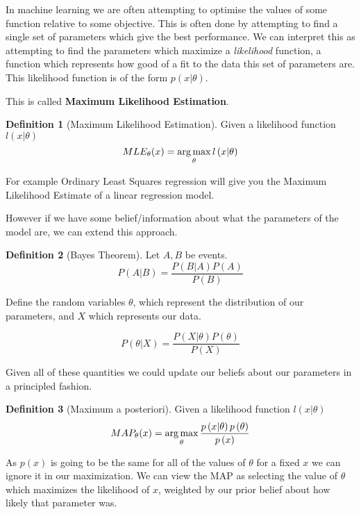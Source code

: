 \documentclass[12pt, a4paper]{report}
\theoremstyle{definition}
\theoremstyle{definition}
\newtheorem{definition}{Definition}[section]
\theoremstyle{definition}
\begin{document}
In machine learning we are often attempting to optimise the values of some function relative to some objective. This is often done by attempting to find a single set of parameters which give the best performance. We can interpret this as attempting to find the parameters which maximize a \textit{likelihood} function, a function which represents how good of a fit to the data this set of parameters are. This likelihood function is of the form $p(x | \theta)$.


This is called \textbf{Maximum Likelihood Estimation}.

\begin{definition}[Maximum Likelihood Estimation]
    Given a likelihood function $l(x | \theta)$
$$MLE_{\theta}(x) = \operatorname*{arg\,max}_{\theta} l\left(x | \theta\right)$$
\end{definition}

For example Ordinary Least Squares regression will give you the Maximum Likelihood Estimate of a linear regression model.

However if we have some belief/information about what the parameters of the model are, we can extend this approach.

\begin{definition}[Bayes Theorem]
    Let $A,B$ be events.
$$P \left( A | B\right) = \frac{P \left( B | A\right) P \left(A\right)}{P \left(B \right)}$$
\end{definition}


Define the random variables $\theta$, which represent the distribution of our parameters, and $X$ which represents our data.

$$P \left( \theta | X\right) = \frac{P \left( X | \theta \right) P \left( \theta\right)}{P \left( X  \right)}$$

Given all of these quantities we could update our beliefs about our parameters in a principled fashion.


\begin{definition}[Maximum a posteriori]
    Given a likelihood function $l(x | \theta)$
$$MAP_{\theta}(x) = \operatorname*{arg\,max}_{\theta}  \frac{p \left( x | \theta \right) p \left( \theta\right)}{p \left( x  \right)}$$
\end{definition}

As $p(x)$ is going to be the same for all of the values of $\theta$ for a fixed $x$ we can ignore it in our maximization. We can view the MAP as selecting the value of $\theta$ which maximizes the likelihood of $x$, weighted by our prior belief about how likely that parameter was.
\end{document}
